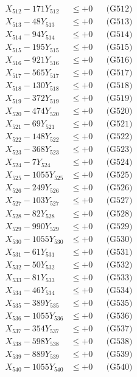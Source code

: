 \documentclass[a4paper,10pt]{article}
\begin{document}
{\begin{align}
X_{512} - 171Y_{512} &\leq +0 && \text{(G512)} \\
X_{513} - 48Y_{513} &\leq +0 && \text{(G513)} \\
X_{514} - 94Y_{514} &\leq +0 && \text{(G514)} \\
X_{515} - 195Y_{515} &\leq +0 && \text{(G515)} \\
X_{516} - 921Y_{516} &\leq +0 && \text{(G516)} \\
X_{517} - 565Y_{517} &\leq +0 && \text{(G517)} \\
X_{518} - 130Y_{518} &\leq +0 && \text{(G518)} \\
X_{519} - 372Y_{519} &\leq +0 && \text{(G519)} \\
X_{520} - 474Y_{520} &\leq +0 && \text{(G520)} \\
\allowbreak
X_{521} - 69Y_{521} &\leq +0 && \text{(G521)} \\
X_{522} - 148Y_{522} &\leq +0 && \text{(G522)} \\
X_{523} - 368Y_{523} &\leq +0 && \text{(G523)} \\
X_{524} - 7Y_{524} &\leq +0 && \text{(G524)} \\
X_{525} - 1055Y_{525} &\leq +0 && \text{(G525)} \\
X_{526} - 249Y_{526} &\leq +0 && \text{(G526)} \\
X_{527} - 103Y_{527} &\leq +0 && \text{(G527)} \\
X_{528} - 82Y_{528} &\leq +0 && \text{(G528)} \\
X_{529} - 990Y_{529} &\leq +0 && \text{(G529)} \\
X_{530} - 1055Y_{530} &\leq +0 && \text{(G530)} \\
\allowbreak
X_{531} - 61Y_{531} &\leq +0 && \text{(G531)} \\
X_{532} - 50Y_{532} &\leq +0 && \text{(G532)} \\
X_{533} - 81Y_{533} &\leq +0 && \text{(G533)} \\
X_{534} - 46Y_{534} &\leq +0 && \text{(G534)} \\
X_{535} - 389Y_{535} &\leq +0 && \text{(G535)} \\
X_{536} - 1055Y_{536} &\leq +0 && \text{(G536)} \\
X_{537} - 354Y_{537} &\leq +0 && \text{(G537)} \\
X_{538} - 598Y_{538} &\leq +0 && \text{(G538)} \\
X_{539} - 889Y_{539} &\leq +0 && \text{(G539)} \\
X_{540} - 1055Y_{540} &\leq +0 && \text{(G540)} \\

\end{align}}
\end{document}
